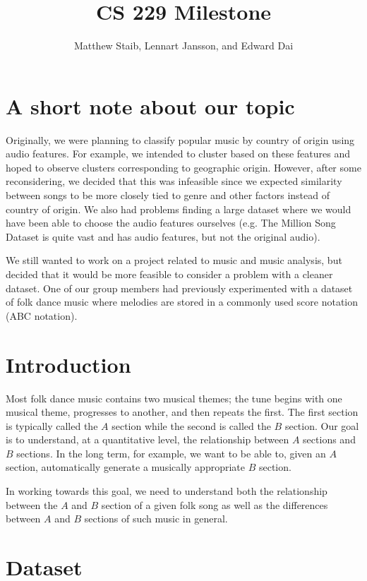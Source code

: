 \documentclass{article} %
\title{CS 229 Milestone}
\author{Matthew Staib, Lennart Jansson, and Edward Dai}
\begin{document}
\maketitle

\section{A short note about our topic}
Originally, we were planning to classify popular music by country of origin
using audio features. For example, we intended to cluster based on these
features and hoped to observe clusters corresponding to geographic origin.
However, after some reconsidering, we decided that this was infeasible since we
expected similarity between songs to be more closely tied to genre and other
factors instead of country of origin. We also had problems finding a large
dataset where we would have been able to choose the audio features ourselves
(e.g. The Million Song Dataset is quite vast and has audio features, but not the
original audio).

We still wanted to work on a project related to music and music analysis, but
decided that it would be more feasible to consider a problem with a cleaner
dataset. One of our group members had previously experimented with a dataset of
folk dance music where melodies are stored in a commonly used score notation
(ABC notation).

\section{Introduction}
Most folk dance music contains two musical themes; the tune begins with one
musical theme, progresses to another, and then repeats the first. The first
section is typically called the $A$ section while the second is called the $B$
section. Our goal is to understand, at a quantitative level, the relationship
between $A$ sections and $B$ sections. In the long term, for example, we want to
be able to, given an $A$ section, automatically generate a musically appropriate
$B$ section.

In working towards this goal, we need to understand both the relationship
between the $A$ and $B$ section of a given folk song as well as the differences
between $A$ and $B$ sections of such music in general. 

\section{Dataset}
\end{document}
